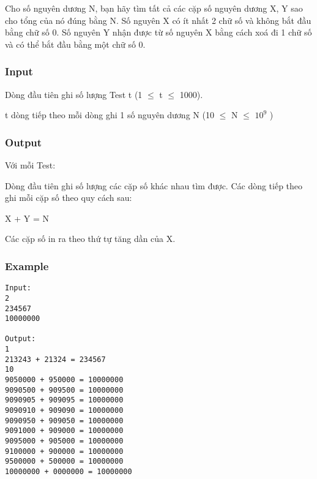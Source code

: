 



   Cho số nguyên dương N, bạn hãy tìm tất cả các cặp số nguyên dương X, Y sao cho tổng của nó đúng bằng N. Số nguyên X có ít nhất 2 chữ số và không bắt đầu bằng chữ số 0. Số nguyên Y nhận được từ số nguyên X bằng cách xoá đi 1 chữ số và có thể bắt đầu bằng một chữ số 0.  

\subsubsection{   Input  }

   Dòng đầu tiên ghi số lượng Test t (1  $\le$  t  $\le$  1000).  

   t dòng tiếp theo mỗi dòng ghi 1 số nguyên dương N (10  $\le$  N  $\le$  $10^{9}$   )  

\subsubsection{   Output  }

   Với mỗi Test:  

   Dòng đầu tiên ghi số lượng các cặp số khác nhau tìm được.  Các dòng tiếp theo ghi mỗi cặp số theo quy cách sau:  

   X + Y = N  

   Các cặp số in ra theo thứ tự tăng dần của X.  

\subsubsection{   Example  }
\begin{verbatim}
Input:
2
234567
10000000

Output:
1
213243 + 21324 = 234567
10
9050000 + 950000 = 10000000
9090500 + 909500 = 10000000
9090905 + 909095 = 10000000
9090910 + 909090 = 10000000
9090950 + 909050 = 10000000
9091000 + 909000 = 10000000
9095000 + 905000 = 10000000
9100000 + 900000 = 10000000
9500000 + 500000 = 10000000
10000000 + 0000000 = 10000000

\end{verbatim}

